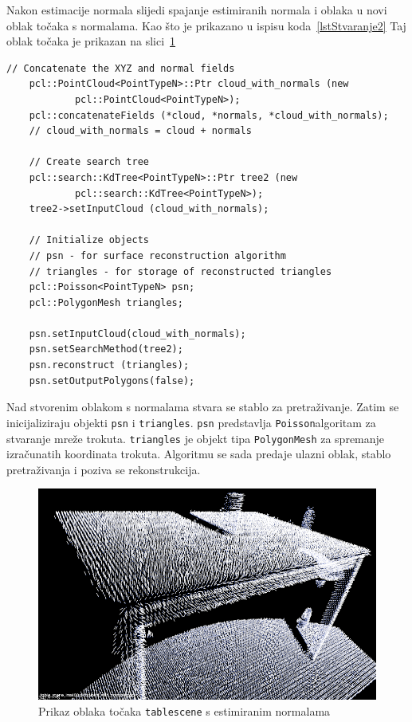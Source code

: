 Nakon estimacije normala slijedi spajanje estimiranih normala i oblaka u
novi oblak točaka s normalama. Kao što je prikazano u ispisu
koda~\ref{lstStvaranje2} Taj oblak točaka je prikazan na 
slici~\ref{fig:tablescene-normals}

\newpage
\begin{lstlisting}[label=lstStvaranje2,caption={Dio izvornog koda za
    stvaranju mreže iz funkcije \texttt{reconstruct\_mesh()} }]
    // Concatenate the XYZ and normal fields
    pcl::PointCloud<PointTypeN>::Ptr cloud_with_normals (new
            pcl::PointCloud<PointTypeN>);
    pcl::concatenateFields (*cloud, *normals, *cloud_with_normals);
    // cloud_with_normals = cloud + normals

    // Create search tree 
    pcl::search::KdTree<PointTypeN>::Ptr tree2 (new
            pcl::search::KdTree<PointTypeN>);
    tree2->setInputCloud (cloud_with_normals);

    // Initialize objects 
    // psn - for surface reconstruction algorithm
    // triangles - for storage of reconstructed triangles
    pcl::Poisson<PointTypeN> psn;
    pcl::PolygonMesh triangles;

    psn.setInputCloud(cloud_with_normals);
    psn.setSearchMethod(tree2);
    psn.reconstruct (triangles);
    psn.setOutputPolygons(false);
\end{lstlisting}

Nad stvorenim oblakom s normalama stvara se stablo za pretraživanje.
Zatim se inicijaliziraju objekti \texttt{psn} i \texttt{triangles}.
\texttt{psn} predstavlja \texttt{Poisson}\footnotemark[1] algoritam za
stvaranje mreže trokuta. \texttt{triangles} je objekt tipa
\texttt{PolygonMesh} za spremanje izračunatih koordinata trokuta.
Algoritmu se sada predaje ulazni oblak, stablo pretraživanja i poziva se
rekonstrukcija.


\begin{figure}[h]
\centering
\includegraphics[scale=0.5]{figures/tablescene-normals.png}
\caption{Prikaz oblaka točaka \texttt{tablescene} s estimiranim
normalama }
\label{fig:tablescene-normals}
\end{figure}

